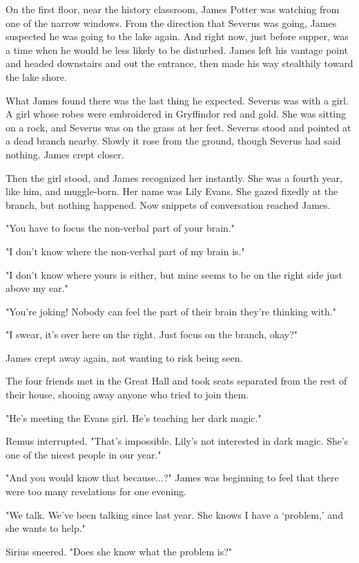 \documentclass[a4paper,11pt]{article}
\begin{document}
On the first floor, near the history classroom, James Potter was watching from one of the narrow windows. From the direction that Severus was going, James suspected he was going to the lake again. And right now, just before supper, was a time when he would be less likely to be disturbed. James left his vantage point and headed downstairs and out the entrance, then made his way stealthily toward the lake shore.

What James found there was the last thing he expected. Severus was with a girl. A girl whose robes were embroidered in Gryffindor red and gold. She was sitting on a rock, and Severus was on the grass at her feet. Severus stood and pointed at a dead branch nearby. Slowly it rose from the ground, though Severus had said nothing. James crept closer.

Then the girl stood, and James recognized her instantly. She was a fourth year, like him, and muggle-born. Her name was Lily Evans. She gazed fixedly at the branch, but nothing happened. Now snippets of conversation reached James.

"You have to focus the non-verbal part of your brain."

"I don't know where the non-verbal part of my brain is."

"I don't know where yours is either, but mine seems to be on the right side just above my ear."

"You're joking! Nobody can feel the part of their brain they're thinking with."

"I swear, it's over here on the right. Just focus on the branch, okay?"

James crept away again, not wanting to risk being seen.

The four friends met in the Great Hall and took seats separated from the rest of their house, shooing away anyone who tried to join them.

"He's meeting the Evans girl. He's teaching her dark magic."

Remus interrupted. "That's impossible. Lily's not interested in dark magic. She's one of the nicest people in our year."

"And you would know that because...?" James was beginning to feel that there were too many revelations for one evening.

"We talk. We've been talking since last year. She knows I have a `problem,' and she wants to help."

Sirius sneered. "Does she know what the problem is?"
\end{document}
